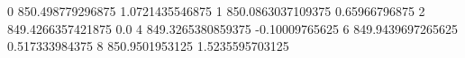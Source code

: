 0 850.498779296875 1.0721435546875
1 850.0863037109375 0.65966796875
2 849.4266357421875 0.0
4 849.3265380859375 -0.10009765625
6 849.9439697265625 0.517333984375
8 850.9501953125 1.5235595703125
